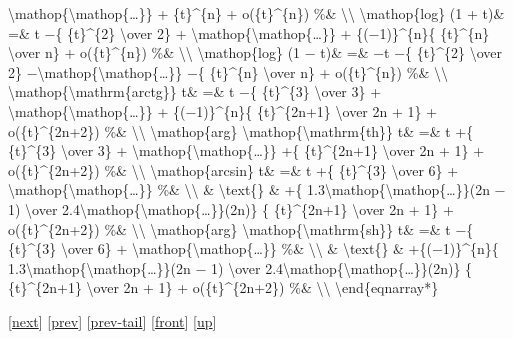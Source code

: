 \documentclass[]{article}
\begin{document}
\textbackslash{}mathop\{\textbackslash{}mathop\{\ldots{}\}\} +
\{t\}\^{}\{n\} + o(\{t\}\^{}\{n\}) \%\& \textbackslash{}\textbackslash{}
\textbackslash{}mathop\{log\} (1 + t)\& =\& t −\{ \{t\}\^{}\{2\}
\textbackslash{}over 2\} +
\textbackslash{}mathop\{\textbackslash{}mathop\{\ldots{}\}\} +
\{(−1)\}\^{}\{n\}\{ \{t\}\^{}\{n\} \textbackslash{}over n\} +
o(\{t\}\^{}\{n\}) \%\& \textbackslash{}\textbackslash{}
\textbackslash{}mathop\{log\} (1 − t)\& =\& −t −\{ \{t\}\^{}\{2\}
\textbackslash{}over 2\}
−\textbackslash{}mathop\{\textbackslash{}mathop\{\ldots{}\}\} −\{
\{t\}\^{}\{n\} \textbackslash{}over n\} + o(\{t\}\^{}\{n\}) \%\&
\textbackslash{}\textbackslash{}
\textbackslash{}mathop\{\textbackslash{}mathrm\{arctg\}\} t\& =\& t −\{
\{t\}\^{}\{3\} \textbackslash{}over 3\} +
\textbackslash{}mathop\{\textbackslash{}mathop\{\ldots{}\}\} +
\{(−1)\}\^{}\{n\}\{ \{t\}\^{}\{2n+1\} \textbackslash{}over 2n + 1\} +
o(\{t\}\^{}\{2n+2\}) \%\& \textbackslash{}\textbackslash{}
\textbackslash{}mathop\{arg\}
\textbackslash{}mathop\{\textbackslash{}mathrm\{th\}\} t\& =\& t +\{
\{t\}\^{}\{3\} \textbackslash{}over 3\} +
\textbackslash{}mathop\{\textbackslash{}mathop\{\ldots{}\}\} +\{
\{t\}\^{}\{2n+1\} \textbackslash{}over 2n + 1\} + o(\{t\}\^{}\{2n+2\})
\%\& \textbackslash{}\textbackslash{} \textbackslash{}mathop\{arcsin\}
t\& =\& t +\{ \{t\}\^{}\{3\} \textbackslash{}over 6\} +
\textbackslash{}mathop\{\textbackslash{}mathop\{\ldots{}\}\} \%\&
\textbackslash{}\textbackslash{} \& \textbackslash{}text\{\} \& +\{
1.3\textbackslash{}mathop\{\textbackslash{}mathop\{\ldots{}\}\}(2n − 1)
\textbackslash{}over
2.4\textbackslash{}mathop\{\textbackslash{}mathop\{\ldots{}\}\}(2n)\} \{
\{t\}\^{}\{2n+1\} \textbackslash{}over 2n + 1\} + o(\{t\}\^{}\{2n+2\})
\%\& \textbackslash{}\textbackslash{} \textbackslash{}mathop\{arg\}
\textbackslash{}mathop\{\textbackslash{}mathrm\{sh\}\} t\& =\& t −\{
\{t\}\^{}\{3\} \textbackslash{}over 6\} +
\textbackslash{}mathop\{\textbackslash{}mathop\{\ldots{}\}\} \%\&
\textbackslash{}\textbackslash{} \& \textbackslash{}text\{\} \&
+\{(−1)\}\^{}\{n\}\{
1.3\textbackslash{}mathop\{\textbackslash{}mathop\{\ldots{}\}\}(2n − 1)
\textbackslash{}over
2.4\textbackslash{}mathop\{\textbackslash{}mathop\{\ldots{}\}\}(2n)\} \{
\{t\}\^{}\{2n+1\} \textbackslash{}over 2n + 1\} + o(\{t\}\^{}\{2n+2\})
\%\& \textbackslash{}\textbackslash{} \textbackslash{}end\{eqnarray*\}

{[}\href{coursse34.html}{next}{]} {[}\href{coursse32.html}{prev}{]}
{[}\href{coursse32.html\#tailcoursse32.html}{prev-tail}{]}
{[}\href{coursse33.html}{front}{]}
{[}\href{coursch7.html\#coursse33.html}{up}{]}
\end{document}
